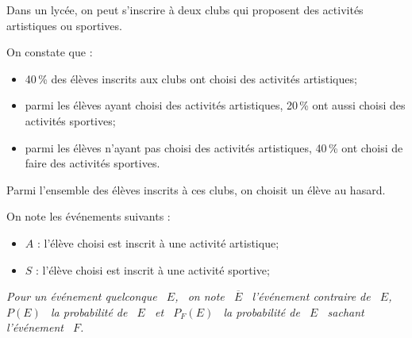 Dans un lycée, on peut s'inscrire à deux clubs qui proposent des activités artistiques ou sportives.

On constate que :
\begin{itemize}[label=$\bullet$]
	\item 40\,\% des élèves inscrits aux clubs ont choisi des activités artistiques;
	\item parmi les élèves ayant choisi des activités artistiques, 20\,\% ont aussi choisi des activités sportives;
	\item parmi les élèves n'ayant pas choisi des activités artistiques, 40\,\% ont choisi de faire des activités sportives.
\end{itemize}

Parmi l'ensemble des élèves inscrits à ces clubs, on choisit un élève au hasard.

On note les événements suivants :

\begin{itemize}[label=$\bullet$]
	\item $A$ : \og{}l'élève choisi est inscrit à une activité artistique\fg{};
	
	\item $S$ :  \og{}l'élève choisi est inscrit à une activité sportive\fg{};
\end{itemize}

\emph{Pour un événement quelconque ~$E$,~ on note ~$\overline{E}$~ l'événement contraire de ~$E$,~ $P(E)$~ la probabilité de ~$E$~ et ~$P_F (E)$~ la probabilité de ~$E$~ sachant l'événement ~$F$.}

